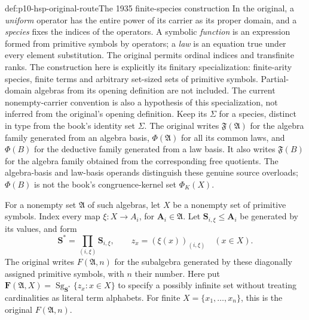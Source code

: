 \begin{hbdefinition}{def:p10-hsp-original-route}{The 1935 finite-species construction}
In the original, a \emph{uniform} operator has the entire
power of its carrier as its proper domain, and a \emph{species}
fixes the indices of the operators. A symbolic \emph{function}
is an expression formed from primitive symbols by operators;
a \emph{law} is an equation true under every element substitution.
The original permits ordinal indices and transfinite ranks.
The construction here is explicitly its finitary specialization:
finite-arity species, finite terms and arbitrary set-sized
sets of primitive symbols. Partial-domain algebras from its
opening definition are not included.
The current nonempty-carrier convention is also a hypothesis
of this specialization, not inferred from the original's
opening definition.
Keep its \(\Sigma\) for a species, distinct in type from the
book's identity set \(\Sigma\).
The original writes \(\mathfrak F(\mathfrak A)\) for the
algebra family generated from an algebra basis,
\(\Phi(\mathfrak A)\) for all its common laws, and
\(\Phi(B)\) for the deductive family generated from a law basis.
It also writes \(\mathfrak F(B)\) for the algebra family obtained
from the corresponding free quotients.
The algebra-basis and law-basis operands distinguish these
genuine source overloads; \(\Phi(B)\) is not the book's
congruence-kernel set \(\Phi_K(X)\).

For a nonempty set \(\mathfrak A\) of such algebras, let \(X\)
be a nonempty set of primitive symbols. Index every map
\(\xi:X\to A_i\), for \(\mathbf A_i\in\mathfrak A\).
Let \(\mathbf S_{i,\xi}\leq\mathbf A_i\) be generated
by its values, and form
\[
 \mathbf S^*=\prod_{(i,\xi)}\mathbf S_{i,\xi},\qquad
 z_x=(\xi(x))_{(i,\xi)}\quad(x\in X).
 \tag{HSP.9}
\]
The original writes \(F(\mathfrak A,n)\) for the subalgebra
generated by these diagonally assigned primitive symbols,
with \(n\) their number. Here put
\(\mathbf F(\mathfrak A,X)=
       \operatorname{Sg}_{\mathbf S^*}\{z_x:x\in X\}\)
to specify a possibly infinite set without treating cardinalities
as literal term alphabets.
For finite \(X=\{x_1,\ldots,x_n\}\), this is the original
\(F(\mathfrak A,n)\).
\end{hbdefinition}

